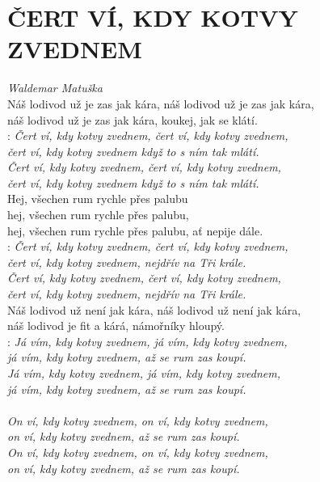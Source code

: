 \section*{\Huge ČERT VÍ, KDY KOTVY ZVEDNEM}
\emph{Waldemar Matuška}\\

Náš lodivod už je zas jak kára, náš lodivod už je zas jak kára,\\
náš lodivod už je zas jak kára, koukej, jak se klátí.\\

\textregistered:
\emph{Čert ví, kdy kotvy zvednem, čert ví, kdy kotvy zvednem,\\
čert ví, kdy kotvy zvednem když to s ním tak mlátí.\\
Čert ví, kdy kotvy zvednem, čert ví, kdy kotvy zvednem,\\
čert ví, kdy kotvy zvednem když to s ním tak mlátí.}\\

Hej, všechen rum rychle přes palubu\\
hej, všechen rum rychle přes palubu,\\
hej, všechen rum rychle přes palubu, ať nepije dále.\\

\textregistered:
\emph{Čert ví, kdy kotvy zvednem, čert ví, kdy kotvy zvednem,\\
čert ví, kdy kotvy zvednem, nejdřív na Tři krále.\\
Čert ví, kdy kotvy zvednem, čert ví, kdy kotvy zvednem,\\
čert ví, kdy kotvy zvednem, nejdřív na Tři krále.}\\

Náš lodivod už není jak kára, náš lodivod už není jak kára,\\
náš lodivod je fit a kárá, námořníky hloupý.\\

\textregistered:
\emph{Já vím, kdy kotvy zvednem, já vím, kdy kotvy zvednem,\\
já vím, kdy kotvy zvednem, až se rum zas koupí.\\
Já vím, kdy kotvy zvednem, já vím, kdy kotvy zvednem,\\
já vím, kdy kotvy zvednem, až se rum zas koupí.\\
\\
On ví, kdy kotvy zvednem, on ví, kdy kotvy zvednem,\\
on ví, kdy kotvy zvednem, až se rum zas koupí.\\
On ví, kdy kotvy zvednem, on ví, kdy kotvy zvednem,\\
on ví, kdy kotvy zvednem, až se rum zas koupí.}

\newpage

